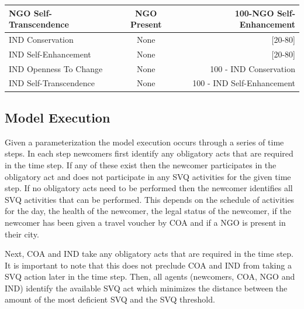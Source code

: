 \documentclass{scspaperproc}
\theoremstyle{scsthe}
\begin{document}
\begin{table}[ht]
\begin{center}
{\begin{tabular}{|lcr|}
\hline
NGO Self-Transcendence                                                                                      & NGO Present           &  100-NGO Self-Enhancement   \\
\hline
IND Conservation                                                                                            & None                  & {[}20-80{]}                \\
\hline
IND Self-Enhancement                                                                                        & None                  & {[}20-80{]}                \\
\hline
IND Openness To Change                                                                                      & None                  &  100 - IND Conservation     \\
\hline
IND Self-Transcendence                                                                                      & None                  &  100 - IND Self-Enhancement \\
\hline
\end{tabular}}
\end{center}
\end{table}

\subsection{Model Execution}
Given a parameterization the model execution occurs through a series of time steps. In each step newcomers first identify any obligatory acts that are required in the time step. If any of these exist then the newcomer participates in the obligatory act and does not participate in any SVQ activities for the given time step. If no obligatory acts need to be performed then the newcomer identifies all SVQ activities that can be performed. This depends on the schedule of activities for the day, the health of the newcomer, the legal status of the newcomer, if the newcomer has been given a travel voucher by COA and if a NGO is present in their city. 

Next, COA and IND take any obligatory acts that are required in the time step. It is important to note that this does not preclude COA and IND from taking a SVQ action later in the time step. Then, all agents (newcomers, COA, NGO and IND) identify the available SVQ act which minimizes the distance between the amount of the most deficient SVQ and the SVQ threshold. %
\end{document}
